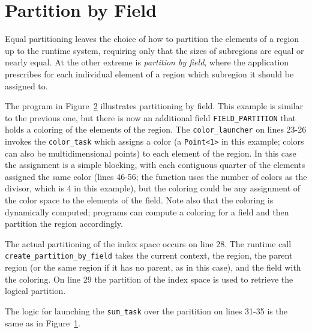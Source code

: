 \begin{figure}
  {\small
   
  }
  \caption{}
  \label{fig:equalpart}
\end{figure}


\section{Partition by Field}
\label{sec:pbf}

Equal partitioning leaves the choice of how to partition the elements of a region
up to the runtime system, requiring only that the sizes of subregions are
equal or nearly equal.  At the other extreme is {\em partition by field}, where
the application prescribes for each individual element of a region which subregion it should be assigned to.

The program in Figure~\ref{fig:pbf} illustrates partitioning by field.  This example is similar to the previous one,
but there is now an additional field {\tt FIELD\_PARTITION} that holds a coloring of the elements of the region.
The {\tt color\_launcher} on lines 23-26 invokes the {\tt color\_task} which assigns a color (a {\tt Point<1>} in this example; colors can also be multidimensional points) to each
element of the region.  In this case the assignment is a simple blocking, with each contiguous quarter of the elements assigned the same
color (lines 46-56; the function uses the number of colors as the divisor, which is 4 in this example), but the coloring could be any assignment of the color space to the elements of the field.  Note also that the
coloring is dynamically computed; programs can compute a coloring for a field and then partition the region accordingly.

The actual partitioning of the index space occurs on line 28.  The runtime call {\tt create\_partition\_by\_field} takes the current
context, the region, the parent region (or the same region if it has no parent, as in this case), and the field with the coloring.
On line 29 the partition of the index space is used to retrieve the logical partition.

The logic for launching the {\tt sum\_task} over the paritition on lines 31-35 is the same as in Figure~\ref{fig:equalpart}.

\begin{figure}
  {\small
   
  }
  \caption{}
  \label{fig:pbf}
\end{figure}

